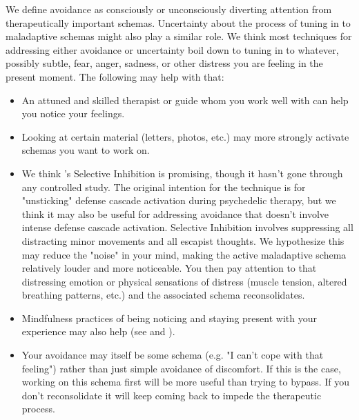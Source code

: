 \documentclass[12pt,letterpaper]{book}
\begin{document}
We define avoidance as consciously or unconsciously diverting attention from therapeutically important schemas. Uncertainty about the process of tuning in to maladaptive schemas might also play a similar role. We think most techniques for addressing either avoidance or uncertainty boil down to tuning in to whatever, possibly subtle, fear, anger, sadness, or other distress you are feeling in the present moment. The following may help with that:
\begin{itemize}
	\item An attuned and skilled therapist or guide whom you work well with can help you notice your feelings.
	\item Looking at certain material (letters, photos, etc.) may more strongly activate schemas you want to work on.
	\item \label{selectiveInhibition} We think \textcite{razviPSIP}'s Selective Inhibition is promising, though it hasn't gone through any controlled study. The original intention for the technique is for "unsticking" defense cascade activation during psychedelic therapy, but we think it may also be useful for addressing avoidance that doesn't involve intense defense cascade activation. Selective Inhibition involves suppressing all distracting minor movements and all escapist thoughts. We hypothesize this may reduce the "noise" in your mind, making the active maladaptive schema relatively louder and more noticeable. You then pay attention to that distressing emotion or physical sensations of distress (muscle tension, altered breathing patterns, etc.) and the associated schema reconsolidates.
	\item Mindfulness practices of being noticing and staying present with your experience may also help (see \textcite{rain} and \textcite{bodyscan}).
	\item Your avoidance may itself be some schema (e.g. "I can't cope with that feeling") rather than just simple avoidance of discomfort. If this is the case, working on this schema first will be more useful than trying to bypass. If you don't reconsolidate it will keep coming back to impede the therapeutic process.
\end{itemize}
\end{document}
